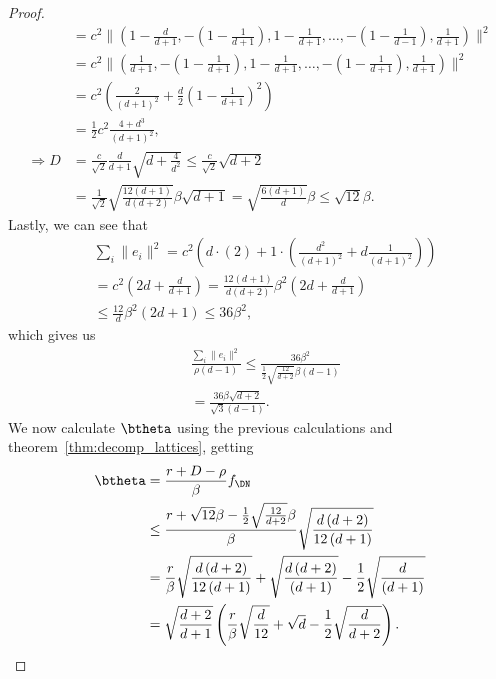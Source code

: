 \begin{proof}
\begin{align*}
        &=c^2\|\left(1-\frac{d}{d+1},-\left(1-\frac{1}{d+1}\right),1-\frac{1}{d+1},\dots,-\left(1-\frac{1}{d-1}\right),\frac{1}{d+1}\right)\|^2\\
        &=c^2\|\left(\frac{1}{d+1},-\left(1-\frac{1}{d+1}\right),1-\frac{1}{d+1},\dots,-\left(1-\frac{1}{d+1}\right),\frac{1}{d+1}\right)\|^2\\
        &=c^2\left(\frac{2}{\left(d+1\right)^2}+\frac{d}{2}\left(1-\frac{1}{d+1}\right)^2\right)\\
        &=\frac{1}{2}c^2\frac{4+d^3}{\left(d+1\right)^2},\\
        \Rightarrow D&=\frac{c}{\sqrt{2}}\frac{d}{d+1}\sqrt{d+\frac{4}{d^2}}\leq\frac{c}{\sqrt{2}}\sqrt{d+2}\\
        &=\frac{1}{\sqrt{2}}\sqrt{\frac{12\left(d+1\right)}{d\left(d+2\right)}}\beta\sqrt{d+1}=\sqrt{\frac{6\left(d+1\right)}{d}}\beta\leq\sqrt{12}\beta.
    \end{align*}
    Lastly, we can see that 
    \begin{align*}
        &\sum_i \|e_i\|^2 =c^2\left(d\cdot\left(2\right)+1\cdot\left(\frac{d^2}{\left(d+1\right)^2}+d\frac{1}{\left(d+1\right)^2}\right)\right)\\
        &=c^2\left(2d+\frac{d}{d+1}\right)
        = \frac{12\left(d+1\right)}{d\left(d+2\right)}\beta^2\left(2d+\frac{d}{d+1}\right)\\
        &\leq\frac{12}{d}\beta^2\left(2d+1\right)\leq 36\beta^2,
    \end{align*}
    which gives us
    \begin{align*}
        &\frac{\sum_i\|e_i\|^2}{\rho\left(d-1\right)}\leq
        \frac{36\beta^2}{\frac{1}{2}\sqrt{\frac{12}{d+2}}\beta\left(d-1\right)}\\
        &=\frac{36\beta\sqrt{d+2}}{\sqrt{3}\left(d-1\right)}.
    \end{align*}
    We now calculate $\btheta$ using the previous calculations and theorem~\ref{thm:decomp_lattices}, getting
    \begin{align*}
        \btheta &= \frac{r+D-\rho}{\beta}f_{\DN}\\
        &\leq \frac{r+\sqrt{12}\beta-\frac{1}{2}\sqrt{\frac{12}{d+2}}\beta}{\beta}\sqrt{\frac{d\left(d+2\right)}{12\left(d+1\right)}}\\
        &= \frac{r}{\beta}\sqrt{\frac{d\left(d+2\right)}{12\left(d+1\right)}}+\sqrt{\frac{d\left(d+2\right)}{\left(d+1\right)}}-\frac{1}{2}\sqrt{\frac{d}{\left(d+1\right)}}\\
        &=\sqrt{\frac{d+2}{d+1}}\left(\frac{r}{\beta}\sqrt{\frac{d}{12}}+\sqrt{d}-\frac{1}{2}\sqrt{\frac{d}{d+2}}\right).

\end{align*}
\end{proof}
